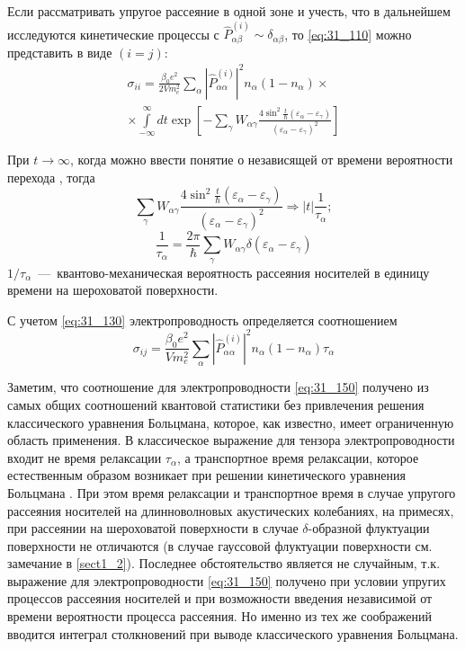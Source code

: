 Если рассматривать упругое рассеяние в одной зоне и учесть, что в дальнейшем исследуются кинетические процессы с $\hat{P}^{(i)}_{\alpha \beta }\sim {\delta }_{\alpha \beta }$, то \eqref{eq:31_110} можно представить в виде $(i=j)$:
\begin{multline} \label{eq:31_120}
\sigma_{ii}=\frac{{\beta }_0e^2}{2Vm^2_e}\sum_{\alpha }{{\left|{\hat{P}}^{(i)}_{\alpha \alpha }\right|}^2 n_{\alpha }\left(1-n_{\alpha }\right)}\times\\
\times\int\limits_{- \infty }^\infty {dt \exp \left[-\sum_{\gamma }{W_{\alpha \gamma }\frac{4 \sin^2 \frac{t}{\hbar}\left({\varepsilon }_{\alpha }-{\varepsilon }_{\gamma }\right)}{(\varepsilon_{\alpha } - \varepsilon_{\gamma })^2}}\right]}
\end{multline}

При $t\to \infty $, когда можно ввести понятие о независящей от времени вероятности перехода \cite{LandauT3}, тогда
\begin{equation} \label{eq:31_130}
\sum_{\gamma }{W_{\alpha \gamma }\frac{4 \sin^2 \frac{t}{\hbar}\left(\varepsilon_{\alpha } - \varepsilon_{\gamma }\right)}{(\varepsilon_{\alpha } - \varepsilon_{\gamma })^2}} \Rightarrow \left|t\right|\frac{1}{\tau_{\alpha}};
\end{equation}
\begin{equation} \label{eq:31_140}
\frac{1}{\tau_{\alpha}}=\frac{2\pi}{\hbar} \sum_{\gamma} {W_{\alpha\gamma} \delta \left(\varepsilon_{\alpha} - \varepsilon_{\gamma} \right)}
\end{equation}
${1}/{\tau_{\alpha}}$~---~квантово-механическая вероятность рассеяния носителей в единицу времени на шероховатой поверхности.

С учетом \eqref{eq:31_130} электропроводность определяется соотношением
\begin{equation} \label{eq:31_150}
\sigma_{ij}=\frac{\beta_0e^2}{Vm^2_e}\sum_{\alpha }{\left|{\hat{P}}^{(i)}_{\alpha \alpha }\right|}^2n_{\alpha }\left(1-n_{\alpha }\right)\tau_{\alpha }
\end{equation}

Заметим, что соотношение для электропроводности \eqref{eq:31_150} получено из самых общих соотношений квантовой статистики без привлечения решения классического уравнения Больцмана, которое, как известно, имеет ограниченную область применения. В классическое выражение для тензора электропроводности входит не время релаксации ${\tau }_{\alpha }$, а транспортное время релаксации, которое естественным образом возникает при решении кинетического уравнения Больцмана \cite{Anselm1978}. При этом время релаксации и транспортное время в случае упругого рассеяния носителей на длинноволновых акустических колебаниях, на примесях, при рассеянии на шероховатой поверхности в случае $\delta $-образной флуктуации поверхности не отличаются (в случае гауссовой флуктуации поверхности см. замечание в \ref{sect1_2}). Последнее обстоятельство является не случайным, т.к. выражение для электропроводности \eqref{eq:31_150} получено при условии упругих процессов рассеяния носителей и при возможности введения независимой от времени вероятности процесса рассеяния. Но именно из тех же соображений вводится интеграл столкновений при выводе классического уравнения Больцмана.

